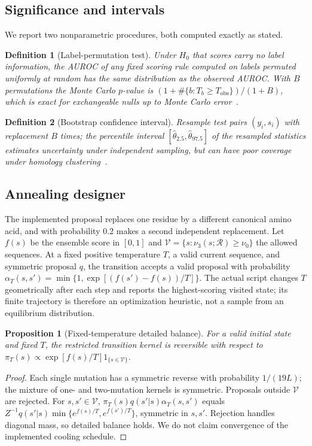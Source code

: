\documentclass[12pt]{article}
\newtheorem{proposition}{Proposition}
\newtheorem{definition}{Definition}
\begin{document}
\subsection{Significance and intervals}
We report two nonparametric procedures, both computed exactly as stated.
\begin{definition}[Label-permutation test]
Under $H_0$ that scores carry no label information, the AUROC of any fixed
scoring rule computed on labels permuted uniformly at random has the same
distribution as the observed AUROC. With $B$ permutations the Monte Carlo
$p$-value is $(1+\#\{b: T_b \ge T_{\text{obs}}\})/(1+B)$, which is exact for
exchangeable nulls up to Monte Carlo error~\cite{permutation}.
\end{definition}
\begin{definition}[Bootstrap confidence interval]
Resample test pairs $(y_i, s_i)$ with replacement $B$ times; the percentile
interval $[\hat\theta_{2.5},\hat\theta_{97.5}]$ of the resampled statistics
estimates uncertainty under independent sampling, but can have poor
coverage under homology clustering~\cite{efron1994}.
\end{definition}

\subsection{Annealing designer}
The implemented proposal replaces one residue by a different canonical
amino acid, and with probability 0.2 makes a second independent replacement.
Let $f(s)$ be the ensemble score in $[0,1]$ and
$\mathcal V=\{s:\nu_3(s;\mathcal R)\ge\nu_0\}$ the allowed sequences.
At a fixed positive temperature $T$, a valid current sequence, and symmetric
proposal $q$, the transition accepts a valid proposal with probability
$\alpha_T(s,s')=\min\{1,\exp[(f(s')-f(s))/T]\}$.
The actual script changes $T$ geometrically after each step and reports the
highest-scoring visited state; its finite trajectory is therefore an
optimization heuristic, not a sample from an equilibrium distribution.
\begin{proposition}[Fixed-temperature detailed balance]
For a valid initial state and fixed $T$, the restricted transition kernel is
reversible with respect to
$\pi_T(s)\propto \exp[f(s)/T]1_{\{s\in\mathcal V\}}$.
\end{proposition}
\begin{proof}
Each single mutation has a symmetric reverse with probability
$1/(19L)$; the mixture of one- and two-mutation kernels is symmetric.
Proposals outside $\mathcal V$ are rejected. For $s,s'\in\mathcal V$,
$\pi_T(s)q(s'|s)\alpha_T(s,s')$ equals
$Z^{-1}q(s'|s)\min\{e^{f(s)/T},e^{f(s')/T}\}$, symmetric in $s,s'$.
Rejection handles diagonal mass, so detailed balance holds. We do not
claim convergence of the implemented cooling schedule.
\end{proof}
\end{document}
